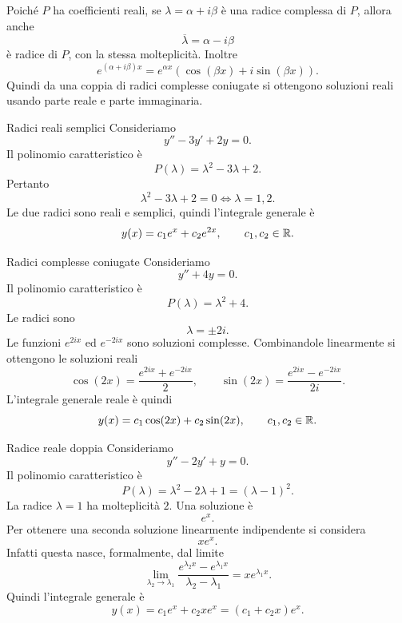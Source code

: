 \documentclass[a4paper]{article}
\begin{document}
\begin{radioactive}
Poiché \(P\) ha coefficienti reali, se \(\lambda=\alpha+i\beta\) è una radice complessa di \(P\), allora anche
\[
    \overline{\lambda}=\alpha-i\beta
\]
è radice di \(P\), con la stessa molteplicità. Inoltre
\[
    e^{(\alpha+i\beta)x}
    =
    e^{\alpha x}\left(\cos(\beta x)+i\sin(\beta x)\right).
\]
Quindi da una coppia di radici complesse coniugate si ottengono soluzioni reali usando parte reale e parte immaginaria.
\end{radioactive}

\begin{radioactive}
\begin{snippetexample}{Radici reali semplici}
    Consideriamo
    \[
        y''-3y'+2y=0.
    \]
    Il polinomio caratteristico è
    \[
        P(\lambda)=\lambda^2-3\lambda+2.
    \]
    Pertanto
    \[
        \lambda^2-3\lambda+2=0
        \iff
        \lambda=1,2.
    \]
    Le due radici sono reali e semplici, quindi l'integrale generale è
    \[
        y(x)=c_1e^x+c_2e^{2x},
        \qquad c_1,c_2\in\mathbb{R}.
    \]
\end{snippetexample}
\end{radioactive}

\begin{radioactive}
\begin{snippetexample}{Radici complesse coniugate}
    Consideriamo
    \[
        y''+4y=0.
    \]
    Il polinomio caratteristico è
    \[
        P(\lambda)=\lambda^2+4.
    \]
    Le radici sono
    \[
        \lambda=\pm 2i.
    \]
    Le funzioni \(e^{2ix}\) ed \(e^{-2ix}\) sono soluzioni complesse. Combinandole linearmente si ottengono le soluzioni reali
    \[
        \cos(2x)=\frac{e^{2ix}+e^{-2ix}}{2},
        \qquad
        \sin(2x)=\frac{e^{2ix}-e^{-2ix}}{2i}.
    \]
    L'integrale generale reale è quindi
    \[
        y(x)=c_1\cos(2x)+c_2\sin(2x),
        \qquad c_1,c_2\in\mathbb{R}.
    \]
\end{snippetexample}
\end{radioactive}

\begin{radioactive}
\begin{snippetexample}{Radice reale doppia}
    Consideriamo
    \[
        y''-2y'+y=0.
    \]
    Il polinomio caratteristico è
    \[
        P(\lambda)=\lambda^2-2\lambda+1=(\lambda-1)^2.
    \]
    La radice \(\lambda=1\) ha molteplicità \(2\). Una soluzione è
    \[
        e^x.
    \]
    Per ottenere una seconda soluzione linearmente indipendente si considera
    \[
        xe^x.
    \]
    Infatti questa nasce, formalmente, dal limite
    \[
        \lim_{\lambda_2\to\lambda_1}
        \frac{e^{\lambda_2x}-e^{\lambda_1x}}{\lambda_2-\lambda_1}
        =
        xe^{\lambda_1x}.
    \]
    Quindi l'integrale generale è
    \[
        y(x)=c_1e^x+c_2xe^x
        =
        (c_1+c_2x)e^x.
    \]
\end{snippetexample}
\end{radioactive}
\end{document}
